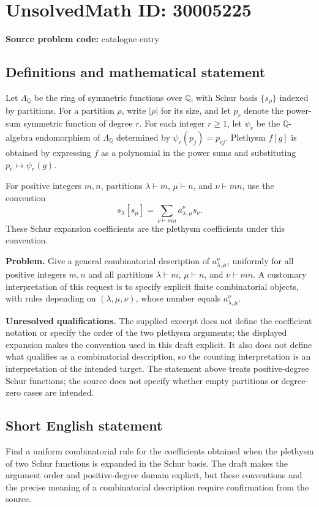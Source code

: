 \documentclass[11pt]{article}
\newcommand{\Q}{\mathbb{Q}}
\begin{document}
\section*{UnsolvedMath ID: 30005225}
\textbf{Source problem code:} catalogue entry
\subsection{Definitions and mathematical statement}
Let \(\Lambda_{\Q}\) be the ring of symmetric functions over \(\Q\), with Schur basis \(\{s_\rho\}\) indexed by partitions. For a partition \(\rho\), write \(|\rho|\) for its size, and let \(p_r\) denote the power-sum symmetric function of degree \(r\). For each integer \(r\geq 1\), let \(\psi_r\) be the \(\Q\)-algebra endomorphism of \(\Lambda_{\Q}\) determined by \(\psi_r(p_j)=p_{rj}\). Plethysm \(f[g]\) is obtained by expressing \(f\) as a polynomial in the power sums and substituting \(p_r\mapsto\psi_r(g)\).

For positive integers \(m,n\), partitions \(\lambda\vdash m\), \(\mu\vdash n\), and \(\nu\vdash mn\), use the convention
\[
 s_\lambda[s_\mu]
 =\sum_{\nu\vdash mn}a^\nu_{\lambda,\mu}s_\nu.
\]
These Schur expansion coefficients are the plethysm coefficients under this convention.

\textbf{Problem.} Give a general combinatorial description of \(a^\nu_{\lambda,\mu}\), uniformly for all positive integers \(m,n\) and all partitions \(\lambda\vdash m\), \(\mu\vdash n\), and \(\nu\vdash mn\). A customary interpretation of this request is to specify explicit finite combinatorial objects, with rules depending on \((\lambda,\mu,\nu)\), whose number equals \(a^\nu_{\lambda,\mu}\).

\textbf{Unresolved qualifications.} The supplied excerpt does not define the coefficient notation or specify the order of the two plethysm arguments; the displayed expansion makes the convention used in this draft explicit. It also does not define what qualifies as a combinatorial description, so the counting interpretation is an interpretation of the intended target. The statement above treats positive-degree Schur functions; the source does not specify whether empty partitions or degree-zero cases are intended.
\subsection{Short English statement}
Find a uniform combinatorial rule for the coefficients obtained when the plethysm of two Schur functions is expanded in the Schur basis. The draft makes the argument order and positive-degree domain explicit, but these conventions and the precise meaning of a combinatorial description require confirmation from the source.
\end{document}
